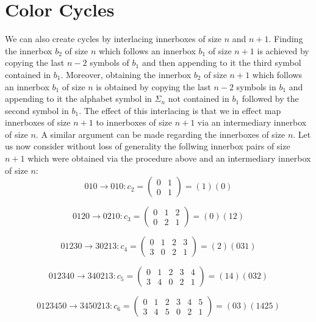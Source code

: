\documentclass[a4paper,10pt]{article}
\begin{document}
\section{Color Cycles}
We can also create cycles by interlacing innerboxes of size $n$ and $n+1$. Finding the innerbox $b_2$ of size $n$ which follows an innerbox $b_1$ of size $n+1$ is achieved by copying the last $n-2$ symbols of $b_1$ and then appending to it the third symbol contained in $b_1$. Moreover, obtaining the innerbox $b_2$ of size $n+1$ which follows an innerbox $b_1$ of size $n$ is obtained by copying the last $n-2$ symbols in $b_1$ and appending to it the alphabet symbol in $\Sigma_n$ not contained in $b_1$ followed by the second symbol in $b_1$. The effect of this interlacing is that we in effect map innerboxes of size $n+1$ to innerboxes of size $n+1$ via an intermediary innerbox of size $n$. A similar argument can be made regarding the innerboxes of size $n$. Let us now consider without loss of generality the follwing innerbox pairs of size $n+1$ which were obtained via the procedure above and an intermediary innerbox of size $n$:
\begin{equation}
010\rightarrow010:c_2=
\begin{pmatrix}
0&1\\
0&1
\end{pmatrix} = (1)(0)
\end{equation}

\begin{equation}
0120\rightarrow0210:c_3=
\begin{pmatrix}
0&1&2\\
0&2&1
\end{pmatrix} = (0)(12)
\end{equation}

\begin{equation}
01230\rightarrow30213:c_4=
\begin{pmatrix}
0&1&2&3\\
3&0&2&1
\end{pmatrix} = (2)(031)
\end{equation}

\begin{equation}
012340\rightarrow340213:c_5=
\begin{pmatrix}
0&1&2&3&4\\
3&4&0&2&1
\end{pmatrix} = (14)(032)
\end{equation}

\begin{equation}
0123450\rightarrow3450213:c_6=
\begin{pmatrix}
0&1&2&3&4&5\\
3&4&5&0&2&1
\end{pmatrix} = (03)(1425)
\end{equation}
\end{document}
